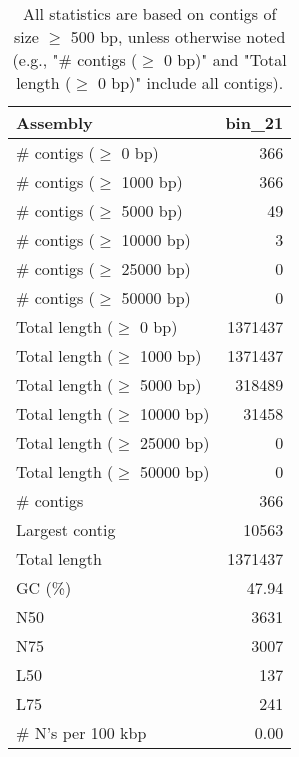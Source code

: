 \documentclass[12pt,a4paper]{article}
\begin{document}
\begin{table}[ht]
\begin{center}
\caption{All statistics are based on contigs of size $\geq$ 500 bp, unless otherwise noted (e.g., "\# contigs ($\geq$ 0 bp)" and "Total length ($\geq$ 0 bp)" include all contigs).}
\begin{tabular}{|l*{1}{|r}|}
\hline
Assembly & bin\_21 \\ \hline
\# contigs ($\geq$ 0 bp) & 366 \\ \hline
\# contigs ($\geq$ 1000 bp) & 366 \\ \hline
\# contigs ($\geq$ 5000 bp) & 49 \\ \hline
\# contigs ($\geq$ 10000 bp) & 3 \\ \hline
\# contigs ($\geq$ 25000 bp) & 0 \\ \hline
\# contigs ($\geq$ 50000 bp) & 0 \\ \hline
Total length ($\geq$ 0 bp) & 1371437 \\ \hline
Total length ($\geq$ 1000 bp) & 1371437 \\ \hline
Total length ($\geq$ 5000 bp) & 318489 \\ \hline
Total length ($\geq$ 10000 bp) & 31458 \\ \hline
Total length ($\geq$ 25000 bp) & 0 \\ \hline
Total length ($\geq$ 50000 bp) & 0 \\ \hline
\# contigs & 366 \\ \hline
Largest contig & 10563 \\ \hline
Total length & 1371437 \\ \hline
GC (\%) & 47.94 \\ \hline
N50 & 3631 \\ \hline
N75 & 3007 \\ \hline
L50 & 137 \\ \hline
L75 & 241 \\ \hline
\# N's per 100 kbp & 0.00 \\ \hline
\end{tabular}
\end{center}
\end{table}
\end{document}
